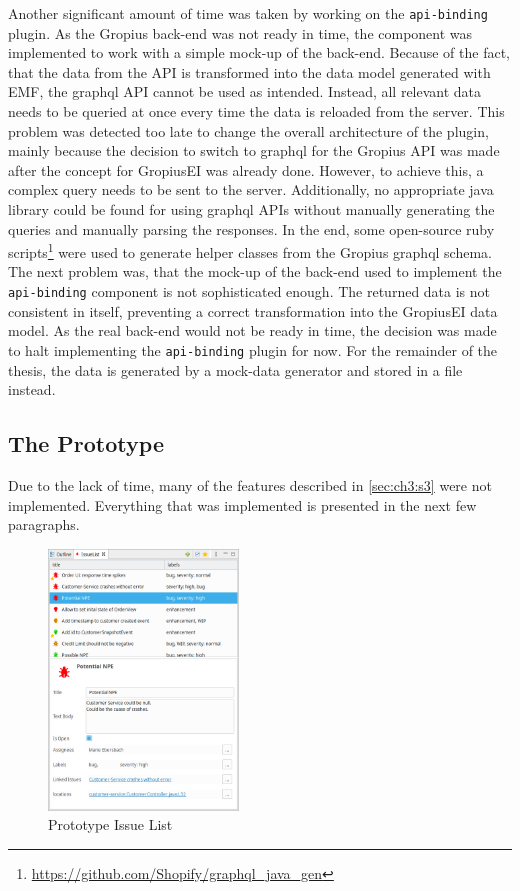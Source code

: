 Another significant amount of time was taken by working on the \lstinline|api-binding| plugin.
As the \gls{Gropius} back-end was not ready in time, the component was implemented to work with a simple mock-up of the back-end.
Because of the fact, that the data from the \gls{API} is transformed into the data model generated with \gls{EMF}, 
the \gls{graphql} \gls{API} cannot be used as intended.
Instead, all relevant data needs to be queried at once every time the data is reloaded from the server.
This problem was detected too late to change the overall architecture of the plugin, 
mainly because the decision to switch to \gls{graphql} for the \gls{Gropius} \gls{API} was made after the concept for \gls{GropiusEI} was already done.
However, to achieve this, a complex query needs to be sent to the server.
Additionally, no appropriate \gls{java} library could be found for using \gls{graphql} \glspl{API} without manually generating the queries and manually parsing the responses. 
In the end, some open-source ruby scripts\footnote{\url{https://github.com/Shopify/graphql_java_gen}} were used to generate helper classes from the \gls{Gropius} \gls{graphql} schema.
The next problem was, that the mock-up of the back-end used to implement the \lstinline|api-binding| component is not sophisticated enough.
The returned data is not consistent in itself, preventing a correct transformation into the \gls{GropiusEI} data model.
As the real back-end would not be ready in time, the decision was made to halt implementing the \lstinline|api-binding| plugin for now.
For the remainder of the thesis, the data is generated by a mock-data generator and stored in a file instead.

\subsection{The Prototype}
Due to the lack of time, many of the features described in \cref{sec:ch3:s3} were not implemented.
Everything that was implemented is presented in the next few paragraphs.

\begin{figure}[!h]
	\centering
	\includegraphics[width=0.45\textwidth]{graphics/screenshot_gropius_ei_issue_list.png}
	\caption{Prototype Issue List}
	\label{fig:c4:screenshot_issue_list}
\end{figure}

